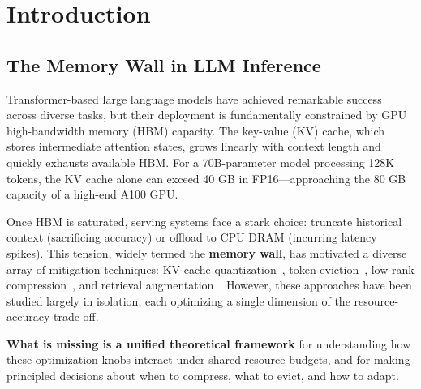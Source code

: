 \documentclass[11pt,a4paper]{article}
\theoremstyle{plain}
\theoremstyle{definition}
\begin{document}
\section{Introduction}

\subsection{The Memory Wall in LLM Inference}
Transformer-based large language models have achieved remarkable success across diverse tasks, but their deployment is fundamentally constrained by GPU high-bandwidth memory (HBM) capacity. The key-value (KV) cache, which stores intermediate attention states, grows linearly with context length and quickly exhausts available HBM. For a 70B-parameter model processing 128K tokens, the KV cache alone can exceed 40 GB in FP16---approaching the 80 GB capacity of a high-end A100 GPU.

Once HBM is saturated, serving systems face a stark choice: truncate historical context (sacrificing accuracy) or offload to CPU DRAM (incurring latency spikes). This tension, widely termed the \textbf{memory wall}, has motivated a diverse array of mitigation techniques: KV cache quantization~\cite{liu2024kivi,hooper2024kvquant}, token eviction~\cite{zhang2023h2o,xiao2024streamingllm}, low-rank compression~\cite{deepseek2024mla,chang2025palu}, and retrieval augmentation~\cite{cheng2026}. However, these approaches have been studied largely in isolation, each optimizing a single dimension of the resource-accuracy trade-off.

\textbf{What is missing is a unified theoretical framework} for understanding how these optimization knobs interact under shared resource budgets, and for making principled decisions about when to compress, what to evict, and how to adapt.
\end{document}
